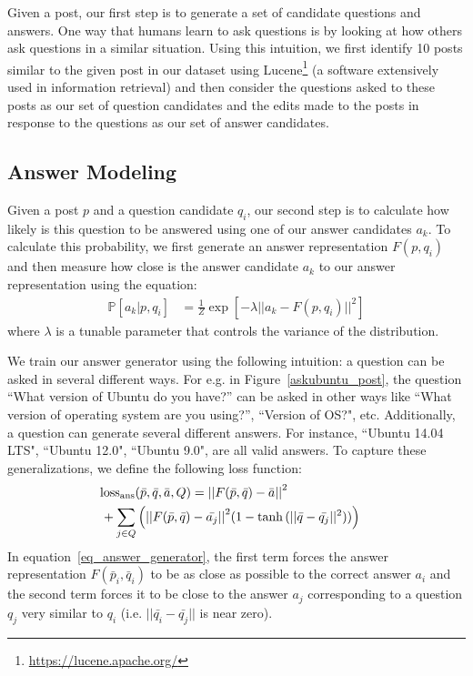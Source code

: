 \documentclass[11pt,a4paper]{article}
\begin{document}
Given a post, our first step is to generate a set of candidate questions and answers. One way that humans learn to ask questions is by looking at how others ask questions in a similar situation. Using this intuition, we first identify 10 posts similar to the given post in our dataset using Lucene\footnote{\url{https://lucene.apache.org/}} (a software extensively used in information retrieval) and then consider the questions asked to these posts as our set of question candidates and the edits made to the posts in response to the questions as our set of answer candidates.

\subsection{Answer Modeling}\label{answer_modeling}

Given a post $p$ and a question candidate $q_i$, our second step is to calculate how likely is this question to be answered using one of our answer candidates $a_k$. To calculate this probability, we first generate an answer representation $F(p,q_i)$ and then measure how close is the answer candidate $a_k$ to our answer representation using the equation:
\begin{align}
\mathbb{P}[a_k |p,q_i]  
&= \frac 1 Z \exp\left[- \lambda || a_k  -  F(p,q_i) ||^2\right]
\end{align}
where $\lambda$ is a tunable parameter that controls the variance of the distribution. 

We train our answer generator using the following intuition: a question can be asked in several different ways. For e.g. in Figure~\ref{askubuntu_post}, the question ``\textsf{\small What version of Ubuntu do you have?}'' can be asked in other ways like ``\textsf{\small What version of operating system are you using?}'', ``\textsf{\small Version of OS?}", etc.  
Additionally, a question can generate several different answers. For instance, ``\textsf{\small Ubuntu 14.04 LTS}", ``\textsf{\small Ubuntu 12.0}", ``\textsf{\small Ubuntu 9.0}", are all valid answers. To capture these generalizations, we define the following loss function:
\begin{align}\label{eq_answer_generator}
\textrm{loss}_{\textrm{ans}}(\bar p, \bar q, \bar a, Q) 
&=  {|| F(\bar p, \bar q) - \bar a||}^2 & \\
&\hspace{-25mm} +  \sum_{j \in Q} \Big ( {|| F(\bar p, \bar q) - \bar{a_j} ||}^2  (1 - \tanh{(|| \bar q - \bar{q_j} ||^2)}) \Big ) &\nonumber
\end{align}
%
 In equation~\ref{eq_answer_generator}, the first term forces the answer representation $F(\bar p_i, \bar q_i)$ to be as close as possible to the correct answer $a_i$ and the second term forces it to be close to the answer $a_j$ corresponding to a question $q_j$ very similar to $q_i$ (i.e. $||\bar{q_i} - \bar{q_j}||$ is near zero).
\end{document}
